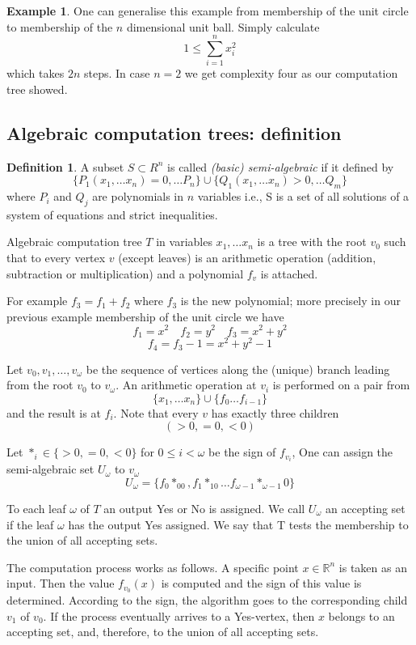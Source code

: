 \documentclass{article}
\theoremstyle{definition}
\newtheorem{definition}{Definition}[section]
\newtheorem{example}{Example}[section]
\begin{document}
\begin{example}
    One can generalise this example from membership of the unit circle to membership
    of the $n$ dimensional unit ball.
    Simply calculate
    $$1 \leq \sum_{i=1}^{n} x_i^2$$
    which takes $2n$ steps. In case $n = 2$ we get complexity four as our computation tree showed.
\end{example}

\subsection{Algebraic computation trees: definition}
\begin{definition}
    A subset $S \subset R^n$ is called \textit{(basic) semi-algebraic} if it defined by
    $$\{P_1(x_1,\dots x_n) = 0,\dots P_n\}
    \cup
    \{Q_1(x_1,\dots x_n) > 0,\dots Q_m\}$$
    where $P_i$ and $Q_j$ are polynomials in $n$ variables
    i.e., S is a set of all solutions of a system of equations and strict inequalities.
\end{definition}

Algebraic computation tree $T$ in variables $x_1,\dots x_n$
is a tree with the root $v_0$ such that to every vertex $v$ (except leaves)
is an arithmetic operation (addition, subtraction or multiplication) 
and a polynomial $f_v$ is attached.

For example $f_3 = f_1 + f_2$ where $f_3$ is the new polynomial;
more precisely in our previous example membership of the unit circle
we have
$$f_1 = x^2 \quad f_2 = y^2 \quad f_3 = x^2 + y^2$$
$$f_4 = f_3 - 1 = x^2 + y^2 - 1$$

Let $v_0, v_1,\dots, v_\omega$ be the sequence of vertices
along the (unique) branch leading from the root $v_0$ to $v_\omega$.
An arithmetic operation at $v_i$ is performed on a pair from
$$\{x_1,\dots x_n\} \cup \{f_0\dots f_{i - 1}\}$$
and the result is at $f_i$.
Note that every $v$ has exactly three children
$$(> 0, = 0, < 0)$$

Let $*_i \in \{>0,=0,<0\}$ for $0 \leq i < \omega$ be the sign of $f_{v_i}$,
One can assign the semi-algebraic set $U_\omega$ to $v_\omega$
$$U_\omega = \{f_0*_00,f_1*_10\dots f_{\omega - 1} *_{\omega - 1}0\}$$

To each leaf $\omega$ of $T$ an output Yes or No is assigned.
We call $U_\omega$ an accepting set if the leaf $\omega$ has the output Yes assigned.
We say that T tests the membership to the union of all accepting sets.

The computation process works as follows.
A specific point $x \in \mathbb{R}^n$ is taken as an input.
Then the value $f_{v_0}(x)$ is computed and the sign of this value is determined.
According to the sign, the algorithm goes to the corresponding child $v_1$ of $v_0$.
If the process eventually arrives to a Yes-vertex, then $x$ belongs to an accepting set,
and, therefore, to the union of all accepting sets.
\end{document}
